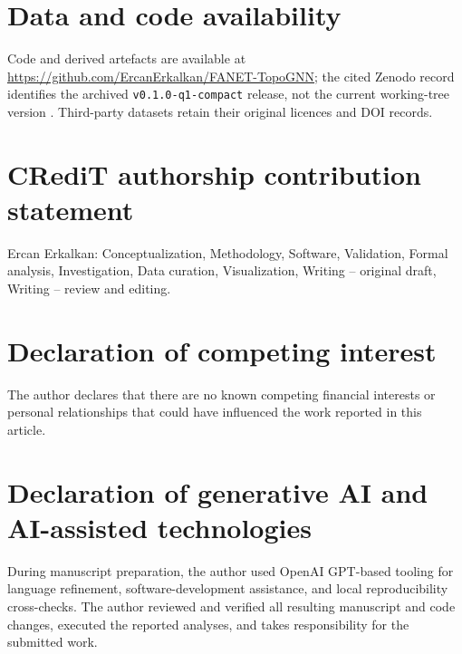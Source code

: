 \documentclass[final,5p,times,twocolumn]{elsarticle}
\newif\ifanonymous
\begin{document}
\ifanonymous
\section*{Data and code availability}
The double-anonymous supplementary package contains the executable code, configurations,
derived data, checksums, and result artefacts required for review. Author-identifying
archive metadata is withheld from the anonymous manuscript.
\else
\section*{Data and code availability}
Code and derived artefacts are available at
\url{https://github.com/ErcanErkalkan/FANET-TopoGNN}; the cited Zenodo record identifies
the archived \texttt{v0.1.0-q1-compact} release, not the current working-tree version
\cite{fanetTopoGNNSoftware}. Third-party datasets retain their
original licences and DOI records.
\fi

\ifanonymous
\else
\section*{CRediT authorship contribution statement}
Ercan Erkalkan: Conceptualization, Methodology, Software, Validation, Formal analysis,
Investigation, Data curation, Visualization, Writing -- original draft, Writing -- review
and editing.

\section*{Declaration of competing interest}
The author declares that there are no known competing financial interests or personal
relationships that could have influenced the work reported in this article.

\section*{Declaration of generative AI and AI-assisted technologies}
During manuscript preparation, the author used OpenAI GPT-based tooling for language
refinement, software-development assistance, and local reproducibility cross-checks. The
author reviewed and verified all resulting manuscript and code changes, executed the
reported analyses, and takes responsibility for the submitted work.
\fi



\end{document}
